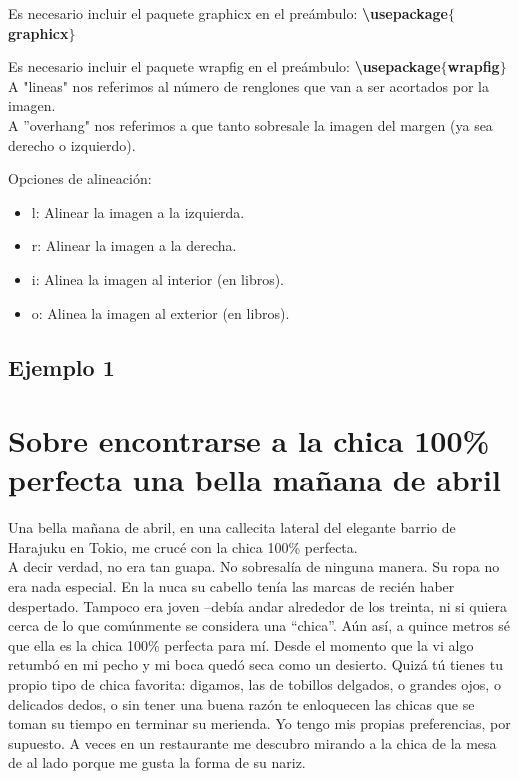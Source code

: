 \documentclass[11pt,letterpaper]{article}
\begin{document}
	 Es necesario incluir el paquete graphicx en el preámbulo: \textbf{\textbackslash 			usepackage$\lbrace$graphicx$\rbrace$} 
	 
	 Es necesario incluir el paquete wrapfig en el preámbulo: \textbf{\textbackslash 			usepackage$\lbrace$wrapfig$\rbrace$} \\
	 
	 A "lineas" nos referimos al número de renglones que van a ser acortados por la imagen. \\
	 
	 A ''overhang" nos referimos a que tanto sobresale la imagen del margen (ya sea derecho o izquierdo).
	 
	 Opciones de alineación: 
	 \begin{itemize}
	 	\item l: Alinear la imagen a la izquierda.
	 	\item r: Alinear la imagen a la derecha.
	 	\item i: Alinea la imagen al interior (en libros).
	 	\item o: Alinea la imagen al exterior (en libros).
	 \end{itemize}
	 
	\subsection{Ejemplo 1}
		 
	\section*{Sobre encontrarse a la chica 100\% perfecta una bella mañana de abril}
	
	Una bella mañana de abril, en una callecita lateral del elegante barrio de Harajuku en Tokio, me crucé con la chica 100\% perfecta. \\

A decir verdad, no era tan guapa. No sobresalía de ninguna manera. Su ropa no era nada especial. En la nuca su cabello tenía las marcas de recién haber despertado. Tampoco era joven –debía andar alrededor de los treinta, ni si quiera cerca de lo que comúnmente se considera una “chica”. Aún así, a quince metros sé que ella es la chica 100\% perfecta para mí. Desde el momento que la vi algo retumbó en mi pecho y mi boca quedó seca como un desierto. Quizá tú tienes tu propio tipo de chica favorita: digamos, las de tobillos delgados, o grandes ojos, o delicados dedos, o sin tener una buena razón te enloquecen las chicas que se toman su tiempo en terminar su merienda. Yo tengo mis propias preferencias, por supuesto. A veces en un restaurante me descubro mirando a la chica de la mesa de al lado porque me gusta la forma de su nariz. \\
	
\end{document}
